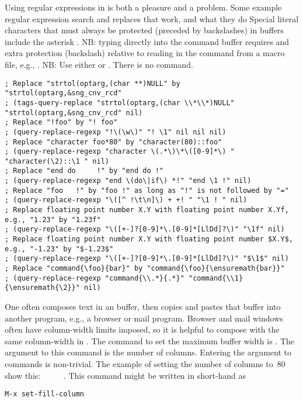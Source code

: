 \documentclass[12pt,twoside]{article}
\begin{document}
Using regular expressions in  is both a pleasure and a
problem. 
Some example regular expression search and replaces that work, and
what they do
Special literal characters that must always be protected (preceded by
backslashes) in  buffers include the asterisk
\kbdprn{*}.
NB: typing directly into the  command buffer requires
and extra protection (backslash) relative to reading in the command
from a macro file, e.g., .
NB: Use either  or
.
There is no  command.
\begin{verbatim}
; Replace "strtol(optarg,(char **)NULL" by "strtol(optarg,&sng_cnv_rcd"
; (tags-query-replace "strtol(optarg,(char \\*\\*)NULL" "strtol(optarg,&sng_cnv_rcd" nil)
; Replace "!foo" by "! foo"
; (query-replace-regexp "!\(\w\)" "! \1" nil nil nil)
; Replace "character foo*80" by "character(80)::foo"
; (query-replace-regexp "character \(.*\)\*\([0-9]*\) " "character(\2)::\1 " nil)
; Replace "end do     !" by "end do !"
; (query-replace-regexp "end \(do\|if\) *!" "end \1 !" nil)
; Replace "foo   !" by "foo !" as long as "!" is not followed by "="
; (query-replace-regexp "\([^ !\t\n]\) + +! " "\1 ! " nil)
; Replace floating point number X.Y with floating point number X.Yf, e.g., "1.23" by "1.23f"
; (query-replace-regexp "\([+-]?[0-9]*\.[0-9]*[LlDd]?\)" "\1f" nil)
; Replace floating point number X.Y with floating point number $X.Y$, e.g., "-1.23" by "$-1.23$"
; (query-replace-regexp "\([+-]?[0-9]*\.[0-9]*[LlDd]?\)" "$\1$" nil)
; Replace "command{\foo}{bar}" by "command{\foo}{\ensuremath{bar}}"
; (query-replace-regexp "command{\\.*}{.*}" "command{\\1}{\ensuremath{\2}}" nil)
\end{verbatim}

One often composes text in an  buffer, then copies and
pastes that buffer into another program, e.g., a browser or mail
program.
Browser and mail windows often have column-width limits imposed, so it
is helpful to compose with the same column-width in .
The command to set the maximum buffer width is
. 
The argument to this command is the number of columns.
Entering the argument to  commands is non-trivial.
The example of setting the number of columns to~80 show this:
~~~~~.
This command might be written in  short-hand as
\begin{verbatim}
M-x set-fill-column
\end{verbatim}
\end{document}
